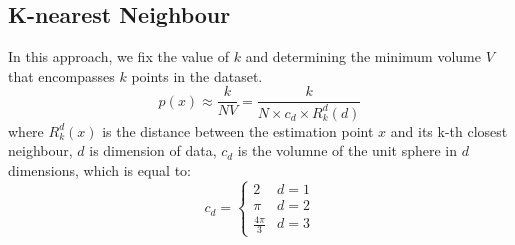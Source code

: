 \begin{multicols}{2}
\section{K-nearest Neighbour}

\noindent In this approach, we fix the value of $k$ and determining the minimum volume $V$ that encompasses $k$ points in the dataset. 
$$p(x)\approx \frac{k}{NV} = \frac{k}{N \times c_d \times R_k^d (d)}$$
\noindent where $R_k^d(x)$ is the distance between the estimation point $x$ and its k-th closest neighbour, $d$ is dimension of data, $c_d$ is the volumne of the unit sphere in $d$ dimensions, which is equal to:
$$
c_d = 
\begin{cases}
2 & d=1 \\
\pi & d=2 \\
\frac{4\pi}{3} & d=3
\end{cases}
$$

\end{multicols}